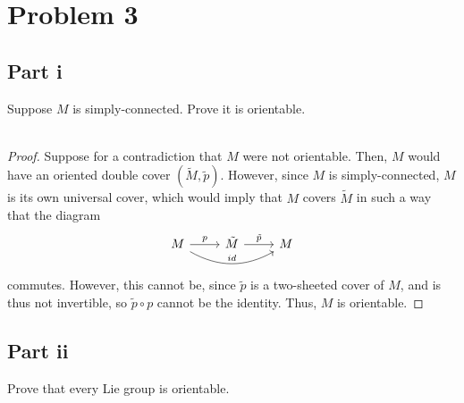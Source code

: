 \documentclass[fontsize=11pt]{scrartcl} %
\numberwithin{equation}{section} %
\numberwithin{figure}{section} %
\numberwithin{table}{section} %
\begin{document}
\section*{Problem 3}
\subsection*{Part i}
Suppose $M$ is simply-connected. Prove it is orientable.
\\
\\
\begin{proof}
    Suppose for a contradiction that $M$ were not orientable. Then, $M$ would
    have an oriented double cover $(\tilde{M},\tilde{p})$.
    However, since $M$ is simply-connected, $M$ is its own universal cover,
    which would imply that $M$ covers $\tilde{M}$ in such a way that the diagram
    \[
\begin{tikzcd}
    M\arrow{r}{p}\arrow[bend right]{rr}{id} &\tilde{M}\arrow{r}{\tilde{p}} &M
\end{tikzcd}
    \]
    commutes. However, this cannot be, since $\tilde{p}$ is a two-sheeted cover
    of $M$, and is thus not invertible, so $\tilde{p}\circ p$ cannot be the
    identity. Thus, $M$ is orientable.
\end{proof}

\subsection*{Part ii}
Prove that every Lie group is orientable.
\end{document}
